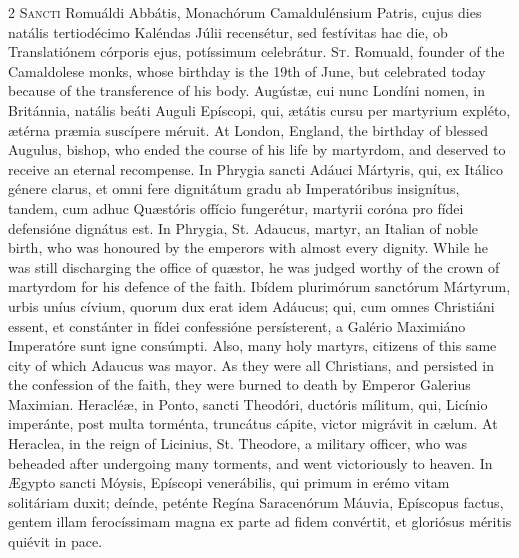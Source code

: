 \begin{paracol}{2}
\lettrine[lines=2]{S}{ancti} Romuáldi Abbátis, Monachórum Camaldulénsium Patris, cujus dies 
 natális tertiodécimo Kaléndas Júlii recensétur, sed festívitas hac die, ob 
 Translatiónem córporis ejus, potíssimum celebrátur.
\switchcolumn
{}
\lettrine[lines=2]{S}{t.} Romuald, founder of the Camaldolese monks, whose birthday is the 19th of 
 June, but celebrated today because of the transference of his body.
\switchcolumn*
{}
Augústæ, cui nunc Londíni nomen, in Británnia, natális beáti Auguli Epíscopi, qui, ætátis cursu per martyrium expléto, 
 ætérna præmia suscípere méruit.
\switchcolumn
{}
At London, England, the birthday of blessed Augulus, bishop, who ended the 
 course of his life by martyrdom, and deserved to receive an eternal 
 recompense.
\switchcolumn*
{}
In Phrygia sancti Adáuci Mártyris, qui, ex Itálico génere clarus, et omni 
 fere dignitátum gradu ab Imperatóribus insignítus, tandem, cum adhuc Quæstóris 
 offício fungerétur, martyrii coróna pro fídei defensióne dignátus est.
\switchcolumn
{}
In Phrygia, St. Adaucus, martyr, an Italian of noble birth, who was honoured 
 by the emperors with almost every dignity. While he was still 
 discharging the office of quæstor, he was judged worthy of the crown of 
 martyrdom for his defence of the faith.
\switchcolumn*
{}
Ibídem plurimórum sanctórum Mártyrum, urbis uníus cívium, quorum dux erat 
 idem Adáucus; qui, cum omnes Christiáni essent, et constánter in fídei 
 confessióne persísterent, a Galério Maximiáno Imperatóre sunt igne consúmpti.
\switchcolumn
{}
Also, many holy martyrs, citizens of this same city of which Adaucus was 
 mayor. As they were all Christians, and persisted in the confession of 
 the faith, they were burned to death by Emperor Galerius Maximian.
\switchcolumn*
{}
Heracléæ, in Ponto, sancti Theodóri, ductóris 
 mílitum, qui, Licínio imperánte, post multa torménta, truncátus cápite, 
 victor migrávit in cælum.
\switchcolumn
{}
At Heraclea, in the reign of Licinius, St. Theodore, a military officer, who 
 was beheaded after undergoing many torments, and went victoriously to 
 heaven.
\switchcolumn*
{}
In Ægypto sancti Móysis, Epíscopi venerábilis, 
 qui primum in erémo vitam solitáriam duxit; deínde, peténte Regína 
 Saracenórum Máuvia, Epíscopus factus, gentem illam ferocíssimam magna ex 
 parte ad fidem convértit, et gloriósus méritis quiévit in pace.

\end{paracol}
